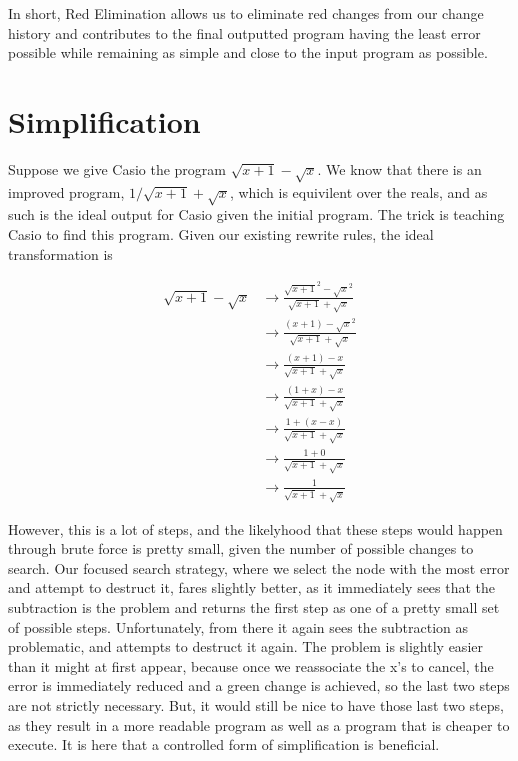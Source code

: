 \documentclass{article}
\newcommand{\sqrsqrt}[1]{\sqrt{#1}^2}
\begin{document}
In short, 
Red Elimination allows us to eliminate
red changes from our change history 
and contributes to the final outputted 
program having the least error possible 
while remaining as simple 
and close to the input program 
as possible.

\section{Simplification}

Suppose we give Casio the program $\sqrt{x+1} - \sqrt{x}$. 
We know that there is an improved program, 
$1/\sqrt{x+1} + \sqrt{x}$, 
which is equivilent over the reals, 
and as such is the ideal output 
for Casio given the initial program. 
The trick is teaching Casio 
to find this program. 
Given our existing rewrite rules, 
the ideal transformation is 

\begin{align*}
\sqrt{x + 1} - \sqrt{x} &\to \frac{\sqrsqrt{x + 1} - \sqrsqrt{x}}{\sqrt{x + 1} + \sqrt{x}}\\
&\to \frac{(x + 1) - \sqrsqrt{x}}{\sqrt{x + 1} + \sqrt{x}}\\
&\to \frac{(x + 1) - x}{\sqrt{x + 1} + \sqrt{x}}\\
&\to \frac{(1 + x) - x}{\sqrt{x + 1} + \sqrt{x}}\\
&\to \frac{1 + (x - x)}{\sqrt{x + 1} + \sqrt{x}}\\
&\to \frac{1 + 0}{\sqrt{x + 1} + \sqrt{x}}\\
&\to \frac{1}{\sqrt{x + 1} + \sqrt{x}}
\end{align*}

However, this is a lot of steps, 
and the likelyhood that these steps 
would happen through brute force 
is pretty small, 
given the number of possible 
changes to search. 
Our focused search strategy, 
where we select the node 
with the most error 
and attempt to destruct it, 
fares slightly better, 
as it immediately sees that the subtraction is the problem 
and returns the first step as one 
of a pretty small set of possible steps. 
Unfortunately, 
from there it again sees the subtraction as problematic, 
and attempts to destruct it again. 
The problem is slightly easier than it might at first appear, 
because once we reassociate the x's to cancel, 
the error is immediately reduced 
and a green change is achieved, 
so the last two steps are not strictly necessary. 
But, it would still be nice to have those last two steps, 
as they result in a more readable program 
as well as a program that is cheaper to execute. 
It is here that a controlled form 
of simplification is beneficial.
\end{document}
